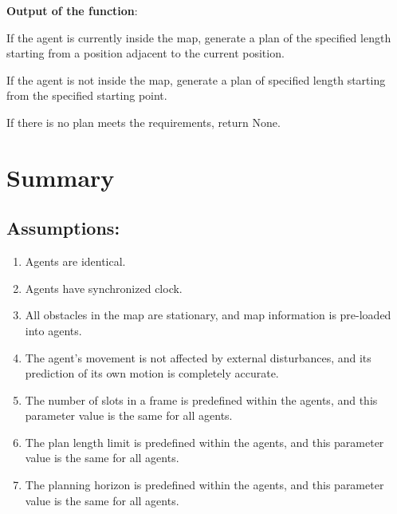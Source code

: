 \begin{algorithm}[H]
{        
    }
\end{algorithm}

\textbf{Output of the function}:

If the agent is currently inside the map, generate a plan of the specified length starting from a position adjacent to the current position.

If the agent is not inside the map, generate a plan of specified length starting from the specified starting point.

If there is no plan meets the requirements, return None.

\section{Summary}

\subsection{Assumptions:}
\begin{enumerate}
    \item Agents are identical.
    \item Agents have synchronized clock. 
    \item All obstacles in the map are stationary, and map information is pre-loaded into agents.
    \item The agent’s movement is not affected by external disturbances, and its prediction of its own motion is completely accurate.
    \item The number of slots in a frame is predefined within the agents, and this parameter value is the same for all agents.
    \item The plan length limit is predefined within the agents, and this parameter value is the same for all agents.
    \item The planning horizon is predefined within the agents, and this parameter value is the same for all agents.
\end{enumerate}

